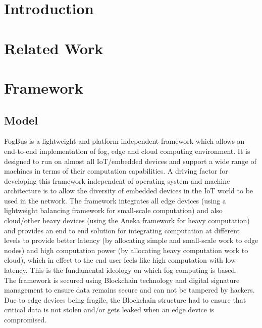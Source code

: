 \documentclass[AMA,STIX1COL]{WileyNJD-v2}
\begin{document}

\maketitle



\section{Introduction}

\clearpage

\section{Related Work}

\clearpage

\section{Framework}

\subsection{Model}

FogBus is a lightweight and platform independent framework which allows an end-to-end implementation of fog, edge and cloud computing environment. It is designed to run on almost all IoT/embedded devices and support a wide range of machines in terms of their computation capabilities. A driving factor for developing this framework independent of operating system and machine architecture is to allow the diversity of embedded devices in the IoT world to be used in the network. The framework integrates all edge devices (using a lightweight balancing framework for small-scale computation) and also cloud/other heavy devices (using the Aneka framework for heavy computation) and provides an end to end solution for integrating computation at different levels to provide better latency (by allocating simple and small-scale work to edge nodes) and high computation power (by allocating heavy computation work to cloud), which in effect to the end user feels like high computation with low latency. This is the fundamental ideology on which fog computing is based.\\
The framework is secured using Blockchain technology and digital signature management to ensure data remains secure and can not be tampered by hackers. Due to edge devices being fragile, the Blockchain structure had to ensure that critical data is not stolen and/or gets leaked when an edge device is compromised. 
\end{document}
